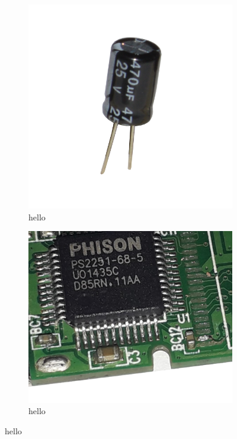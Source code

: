 \documentclass[12pt]{article}
\begin{document}
\begin{figure}[h!]
  \centering
  \begin{subfigure}[b]{0.25\linewidth}
    \includegraphics[width=\linewidth]{data/condensatore-reale.jpg}
    \caption*{hello}
  \end{subfigure}
  \begin{subfigure}[b]{0.25\linewidth}
    \includegraphics[width=\linewidth]{data/PCB-capacitor.png}
    \caption*{hello}
  \end{subfigure}
  

\end{figure}
\end{document}

